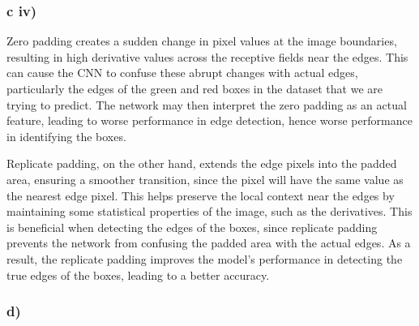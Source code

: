 \documentclass{article}
\begin{document}
\subsubsection*{c iv)}

Zero padding creates a sudden change in pixel values at the image boundaries, resulting in high derivative values across
the receptive fields near the edges. This can cause the CNN to confuse these abrupt changes with actual edges,
particularly the edges of the green and red boxes in the dataset that we are trying to predict.
The network may then interpret the zero padding as an actual feature, leading to worse performance in
edge detection, hence worse performance in identifying the boxes.

Replicate padding, on the other hand, extends the edge pixels into the padded area, ensuring a smoother transition, since
the pixel will have the same value as the nearest edge pixel. This helps preserve the local context near the edges by maintaining
some statistical properties of the image, such as the derivatives. This is beneficial
when detecting the edges of the boxes, since replicate padding prevents the network from confusing the padded area with the actual
edges. As a result, the replicate padding improves the model's performance in detecting the true edges of the boxes, leading
to a better accuracy.



\subsubsection*{d)}
\end{document}
